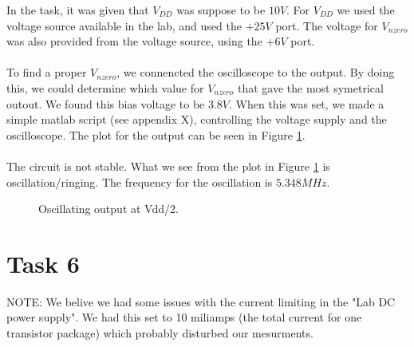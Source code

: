 \documentclass[a4paper,english,11pt]{article}
\begin{document}
In the task, it was given that $V_{DD}$ was suppose to be $10 V$. For $V_{DD}$ we used the voltage source available in the lab, and used the $+ 25V$ port.
The voltage for $V_{nzero}$ was also provided from the voltage source, using the $+ 6V$ port.\\
\\
To find a proper $V_{nzero}$, we connencted the oscilloscope to the output. By doing this, we could determine which value for $V_{nzero}$ that gave the 
most symetrical outout. We found this bias voltage to be $3.8V$. When this was set, we made a simple matlab script (see appendix X), controlling the 
voltage supply and the oscilloscope. The plot for the output can be seen in Figure \ref{fig:oscil:out}.\\
\\
The circuit is not stable. What we see from the plot in Figure \ref{fig:oscil:out} is oscillation/ringing. The frequency for the oscillation is
$5.348 MHz$.
\begin{figure}[!htbp]
 \centering
  \caption{Oscillating output at Vdd/2.}
  \label{fig:oscil:out}	
\end{figure}

\newpage
\section{Task 6}
NOTE: We belive we had some issues with the current limiting in the "Lab DC power supply". We had this set to 10 miliamps (the total current for one transistor package) 
which probably disturbed our mesurments.
\end{document}

